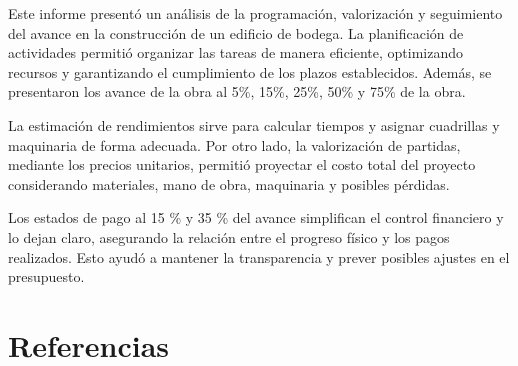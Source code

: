 \documentclass{article} %
\begin{document}
Este informe presentó un análisis de la programación, valorización y seguimiento del avance en la construcción de un edificio de bodega. La planificación de actividades permitió organizar las tareas de manera eficiente, optimizando recursos y garantizando el cumplimiento de los plazos establecidos. Además, se presentaron los avance de la obra al 5\%, 15\%, 25\%, 50\% y 75\% de la obra.

La estimación de rendimientos sirve para calcular tiempos y asignar cuadrillas y maquinaria de forma adecuada. Por otro lado, la valorización de partidas, mediante los precios unitarios, permitió proyectar el costo total del proyecto considerando materiales, mano de obra, maquinaria y posibles pérdidas.

Los estados de pago al 15 \% y 35 \% del avance simplifican el control financiero y lo dejan claro, asegurando la relación entre el progreso físico y los pagos realizados. Esto ayudó a mantener la transparencia y prever posibles ajustes en el presupuesto.

\newpage
\section{Referencias}
\nocite{*}

  
\end{document}
